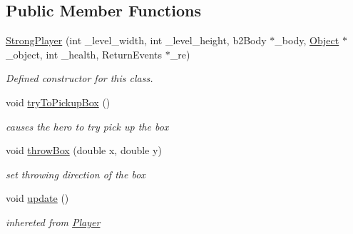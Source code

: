 \subsection*{Public Member Functions}
\begin{DoxyCompactItemize}
\item 
\hyperlink{class_strong_player_ad8c557c1ae5ada0ce8676c601b16653d}{Strong\+Player} (int \+\_\+level\+\_\+width, int \+\_\+level\+\_\+height, b2\+Body $\ast$\+\_\+body, \hyperlink{class_object}{Object} $\ast$\+\_\+object, int \+\_\+health, Return\+Events $\ast$\+\_\+re)
\begin{DoxyCompactList}\small\item\em Defined constructor for this class. \end{DoxyCompactList}\item 
\mbox{\label{class_strong_player_acdae803bf66f620bc73b105ca06c46ab}} 
void \hyperlink{class_strong_player_acdae803bf66f620bc73b105ca06c46ab}{try\+To\+Pickup\+Box} ()
\begin{DoxyCompactList}\small\item\em causes the hero to try pick up the box \end{DoxyCompactList}\item 
void \hyperlink{class_strong_player_afb33164ecdb89f91cb32c9b59c6805d1}{throw\+Box} (double x, double y)
\begin{DoxyCompactList}\small\item\em set throwing direction of the box \end{DoxyCompactList}\item 
\mbox{\label{class_strong_player_a2e9ec64367e36c1bef0e30293706c1ab}} 
void \hyperlink{class_strong_player_a2e9ec64367e36c1bef0e30293706c1ab}{update} ()
\begin{DoxyCompactList}\small\item\em inhereted from \hyperlink{class_player}{Player} \end{DoxyCompactList}\end{DoxyCompactItemize}
